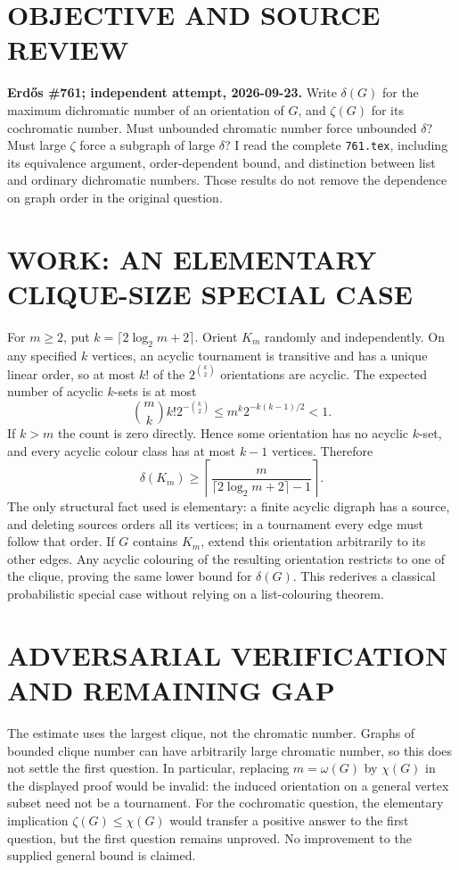 \section{OBJECTIVE AND SOURCE REVIEW}
\textbf{Erd\H{o}s \#761; independent attempt, 2026-09-23.}
Write $\delta(G)$ for the maximum dichromatic number of an orientation of $G$, and $\zeta(G)$ for its cochromatic number. Must unbounded chromatic number force unbounded $\delta$? Must large $\zeta$ force a subgraph of large $\delta$? I read the complete \texttt{761.tex}, including its equivalence argument, order-dependent bound, and distinction between list and ordinary dichromatic numbers. Those results do not remove the dependence on graph order in the original question.
\section{WORK: AN ELEMENTARY CLIQUE-SIZE SPECIAL CASE}
For $m\ge2$, put $k=\lceil2\log_2m+2\rceil$. Orient $K_m$ randomly and independently. On any specified $k$ vertices, an acyclic tournament is transitive and has a unique linear order, so at most $k!$ of the $2^{\binom{k}{2}}$ orientations are acyclic. The expected number of acyclic $k$-sets is at most
\[
\binom mk k!2^{-\binom{k}{2}}
\le m^k2^{-k(k-1)/2}<1.
\]
If $k>m$ the count is zero directly. Hence some orientation has no acyclic $k$-set, and every acyclic colour class has at most $k-1$ vertices. Therefore
\[
\delta(K_m)\ge\left\lceil\frac{m}{\lceil2\log_2m+2\rceil-1}\right\rceil.
\]
The only structural fact used is elementary: a finite acyclic digraph has a source, and deleting sources orders all its vertices; in a tournament every edge must follow that order.
If $G$ contains $K_m$, extend this orientation arbitrarily to its other edges. Any acyclic colouring of the resulting orientation restricts to one of the clique, proving the same lower bound for $\delta(G)$. This rederives a classical probabilistic special case without relying on a list-colouring theorem.
\section{ADVERSARIAL VERIFICATION AND REMAINING GAP}
The estimate uses the largest clique, not the chromatic number. Graphs of bounded clique number can have arbitrarily large chromatic number, so this does not settle the first question. In particular, replacing $m=\omega(G)$ by $\chi(G)$ in the displayed proof would be invalid: the induced orientation on a general vertex subset need not be a tournament. For the cochromatic question, the elementary implication $\zeta(G)\le\chi(G)$ would transfer a positive answer to the first question, but the first question remains unproved. No improvement to the supplied general bound is claimed.
